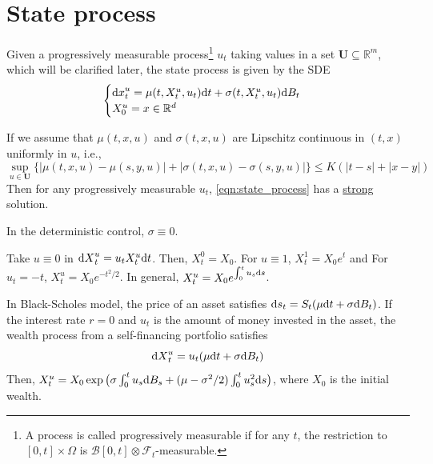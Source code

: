 \documentclass[11pt]{book}
\newcommand{\dd}{\text{\normalfont d}}
\newcommand{\dt}{\text{\normalfont d}t}
\newcommand{\ds}{\text{\normalfont d}s}
\newcommand{\dx}{\text{\normalfont d}x}
\newcommand{\dX}{\text{\normalfont d}X}
\begin{document}
\section{State process}
Given a progressively measurable process\footnote{A process is called progressively measurable if for any $t$, the restriction to $[0,t]\times\Omega$ is $\mathcal{B}[0,t]\otimes\mathcal{F}_t$-measurable.} $u_t$ taking values in a set $\mathbf{U}\subseteq \mathbb{R}^m$, which will be clarified later, the state process is given by the SDE
\begin{equation}\label{eqn:state_process}
	\begin{cases}
	    {\dx}^u_t =\mu(t,X_t^u,u_t){{\dt}}+\sigma(t,X_t^u,u_t){\dd}B_t\\
     X^u_0=x\in\mathbb{R}^d
	\end{cases}
\end{equation}
\begin{rem}
    If we assume that $\mu(t,x,u)$ and $\sigma(t,x,u)$ are Lipschitz continuous in $(t,x)$ uniformly in $u$, i.e.,
    \begin{equation}
       \sup_{u\in\mathbf{U}}\{ |\mu(t,x,u)-\mu(s,y,u)|+|\sigma(t,x,u)-\sigma(s,y,u)|\}\le K(|t-s|+|x-y|)
    \end{equation}
    Then for any progressively measurable $u_t$, \eqref{eqn:state_process} has a \underline{strong} solution.
\end{rem}
\begin{rem}
    In the deterministic control, $\sigma\equiv0$.
\end{rem}

\begin{eg}
	Take $u\equiv0$ in ${\dX}^u_t=u_tX_t^u {{\dt}}$. Then, $X_t^0=X_0$. For $u\equiv 1$, $X_t^1=X_0e^t$ and For $u_t=-t$, $X_t^u=X_0e^{-t^2/2}$. In general, $X_t^u=X_0e^{\int_0^tu_s{{\ds}}}$.
\end{eg}
\begin{eg}\label{eg:wealth}
In Black-Scholes model, the price of an asset satisfies ${{\ds}}_t=S_t(\mu {{\dt}}+\sigma {\dd}B_t)$. If the interest rate $r=0$ and $u_t$ is the amount of money invested in the asset, the wealth process from a self-financing portfolio satisfies
	\begin{equation}
	    {\dX}^u_t=u_t(\mu {{\dt}}+\sigma {\dd}B_t)
	\end{equation} 
 Then, $X_t^u=X_0\exp\big(\sigma\int_0^tu_s{\dd}B_s+(\mu-\sigma^2/2)\int_0^t u^2_s{{\ds}}\big)$, where $X_0$ is the initial wealth.
	\end{eg}
\end{document}
